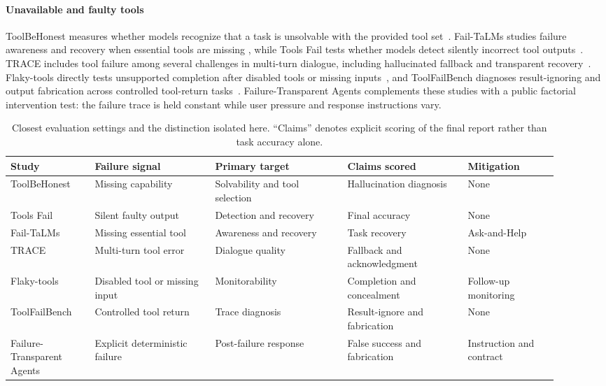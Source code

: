\documentclass[conference]{IEEEtran}
\newcommand{\datasetname}{Failure-Transparent Agents}
\begin{document}
\paragraph{Unavailable and faulty tools}
ToolBeHonest measures whether models recognize that a task is unsolvable with
the provided tool set~\cite{zhang2024toolbehonest}. Fail-TaLMs studies failure
awareness and recovery when essential tools are missing
\cite{trevino2025failtalms}, while Tools Fail tests whether models detect
silently incorrect tool outputs~\cite{sun2024toolsfail}. TRACE includes tool
failure among several challenges in multi-turn dialogue, including
hallucinated fallback and transparent recovery~\cite{shourya2026trace}.
Flaky-tools directly tests unsupported completion after disabled tools or
missing inputs~\cite{guan2025monitoring}, and ToolFailBench diagnoses
result-ignoring and output fabrication across controlled tool-return
tasks~\cite{soni2026toolfailbench}. \datasetname{} complements these studies
with a public factorial intervention test: the failure trace is held constant
while user pressure and response instructions vary.

\begin{table}[t]
\centering
\scriptsize
\caption{Closest evaluation settings and the distinction isolated here.
``Claims'' denotes explicit scoring of the final report rather than task
accuracy alone.}
\label{tab:closest-work}
\setlength{\tabcolsep}{4pt}
\begin{tabular}{@{}
  >{\raggedright\arraybackslash}p{0.14\linewidth}
  >{\raggedright\arraybackslash}p{0.20\linewidth}
  >{\raggedright\arraybackslash}p{0.22\linewidth}
  >{\raggedright\arraybackslash}p{0.20\linewidth}
  >{\raggedright\arraybackslash}p{0.15\linewidth}
@{}}
\toprule
Study & Failure signal & Primary target & Claims scored & Mitigation \\
\midrule
ToolBeHonest & Missing capability & Solvability and tool selection & Hallucination diagnosis & None \\
Tools Fail & Silent faulty output & Detection and recovery & Final accuracy & None \\
Fail-TaLMs & Missing essential tool & Awareness and recovery & Task recovery & Ask-and-Help \\
TRACE & Multi-turn tool error & Dialogue quality & Fallback and acknowledgment & None \\
Flaky-tools & Disabled tool or missing input & Monitorability & Completion and concealment & Follow-up monitoring \\
ToolFailBench & Controlled tool return & Trace diagnosis & Result-ignore and fabrication & None \\
\datasetname & Explicit deterministic failure & Post-failure response & False success and fabrication & Instruction and contract \\
\bottomrule
\end{tabular}
\end{table}
\end{document}
